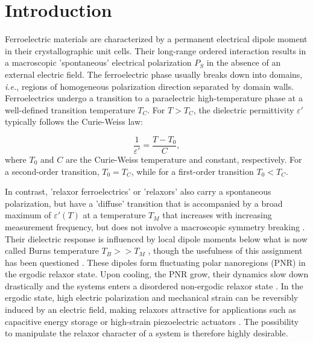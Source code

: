 \documentclass[%
 preprint, %
 amsmath,amssymb,
 aps, physrev,
]{revtex4-2}
\begin{document}

\maketitle

\section{Introduction}

Ferroelectric materials are characterized by a permanent electrical dipole moment in their crystallographic unit cells. Their long-range ordered interaction results in a macroscopic 'spontaneous' electrical polarization $P_S$ in the absence of an external electric field. The ferroelectric phase usually breaks down into domains, {\it i.e.}, regions of homogeneous polarization direction separated by domain walls. Ferroelectrics undergo a transition to a paraelectric high-temperature phase at a well-defined transition temperature $T_C$. For $T> T_C$, the dielectric permittivity $\varepsilon'$ typically follows the Curie-Weiss law:

\begin{equation}\label{CW}
    \frac{1}{\varepsilon'}=\frac{T-T_0}{C},
\end{equation}
where $T_0$ and $C$ are the Curie-Weiss temperature and constant, respectively. For a second-order transition, $T_0 = T_C$, while for a first-order transition $T_0 < T_C$.

In contrast, 'relaxor ferroelectrics' or 'relaxors' also carry a spontaneous polarization, but have a 'diffuse' transition that is accompanied by a broad maximum of $\varepsilon'(T)$ at a temperature $T_M$ that increases with increasing measurement frequency, but does not involve a macroscopic symmetry breaking \cite{Cross94}. Their dielectric response is influenced by local dipole moments below what is now called Burns temperature $T_B >> T_M$ \cite{Burns83}, though the usefulness of this assignment has been questioned \cite{Bobnar11}. These dipoles form fluctuating polar nanoregions (PNR) in the ergodic relaxor state. Upon cooling, the PNR grow, their dynamics slow down drastically and the systems enters a disordered non-ergodic relaxor state \cite{Tagantsev98}. In the ergodic state, high electric polarization and mechanical strain can be reversibly induced by an electric field, making relaxors attractive for applications such as capacitive energy storage \cite{Palneedi18} or high-strain piezoelectric actuators \cite{Jo12}. The possibility to manipulate the relaxor character of a system is therefore highly desirable.
\end{document}
